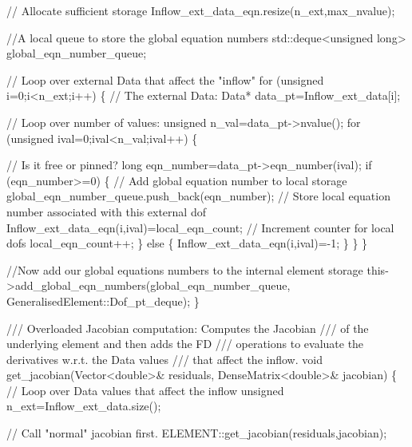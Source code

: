 \begin{DoxyCodeInclude}
   \textcolor{comment}{// Allocate sufficient storage}
   Inflow\_ext\_data\_eqn.resize(n\_ext,max\_nvalue);
   
   \textcolor{comment}{//A local queue to store the global equation numbers}
   std::deque<unsigned long> global\_eqn\_number\_queue;

   \textcolor{comment}{// Loop over external Data that affect the "inflow"}
   \textcolor{keywordflow}{for} (\textcolor{keywordtype}{unsigned} i=0;i<n\_ext;i++)
    \{
     \textcolor{comment}{// The external Data:}
     Data* data\_pt=Inflow\_ext\_data[i];
     
     \textcolor{comment}{// Loop over number of values:}
     \textcolor{keywordtype}{unsigned} n\_val=data\_pt->nvalue();
     \textcolor{keywordflow}{for} (\textcolor{keywordtype}{unsigned} ival=0;ival<n\_val;ival++)
      \{

       \textcolor{comment}{// Is it free or pinned?}
       \textcolor{keywordtype}{long} eqn\_number=data\_pt->eqn\_number(ival);
       \textcolor{keywordflow}{if} (eqn\_number>=0)
        \{
         \textcolor{comment}{// Add global equation number to local storage}
         global\_eqn\_number\_queue.push\_back(eqn\_number);
         \textcolor{comment}{// Store local equation number associated with this external dof}
         Inflow\_ext\_data\_eqn(i,ival)=local\_eqn\_count;
         \textcolor{comment}{// Increment counter for local dofs}
         local\_eqn\_count++;
        \}
       \textcolor{keywordflow}{else}
        \{
         Inflow\_ext\_data\_eqn(i,ival)=-1;
        \}
      \}
    \}
   
   \textcolor{comment}{//Now add our global equations numbers to the internal element storage}
   this->add\_global\_eqn\_numbers(global\_eqn\_number\_queue, 
                                GeneralisedElement::Dof\_pt\_deque);
  \}

 \textcolor{comment}{}
\textcolor{comment}{ /// Overloaded Jacobian computation: Computes the Jacobian}
\textcolor{comment}{ /// of the underlying element and then adds the FD }
\textcolor{comment}{ /// operations to evaluate the derivatives w.r.t. the Data values}
\textcolor{comment}{ /// that affect the inflow.}
\textcolor{comment}{} \textcolor{keywordtype}{void} get\_jacobian(Vector<double>& residuals,
                   DenseMatrix<double>& jacobian)
  \{
   \textcolor{comment}{// Loop over Data values that affect the inflow}
   \textcolor{keywordtype}{unsigned} n\_ext=Inflow\_ext\_data.size();

   \textcolor{comment}{// Call "normal" jacobian first.}
   ELEMENT::get\_jacobian(residuals,jacobian);
   

\end{DoxyCodeInclude}

